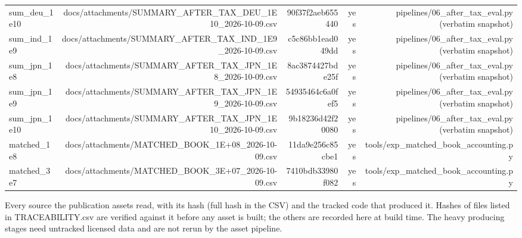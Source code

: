 \begin{table}[t]
\begin{tabular}{lrrrr}
sum\_deu\_1e10 & docs/attachments/SUMMARY\_AFTER\_TAX\_DEU\_1E10\_2026-10-09.csv & 90f37f2aeb655440 & yes & pipelines/06\_after\_tax\_eval.py (verbatim snapshot) \\
sum\_ind\_1e9 & docs/attachments/SUMMARY\_AFTER\_TAX\_IND\_1E9\_2026-10-09.csv & c5c86bb1ead049dd & yes & pipelines/06\_after\_tax\_eval.py (verbatim snapshot) \\
sum\_jpn\_1e8 & docs/attachments/SUMMARY\_AFTER\_TAX\_JPN\_1E8\_2026-10-09.csv & 8ac3874427bde25f & yes & pipelines/06\_after\_tax\_eval.py (verbatim snapshot) \\
sum\_jpn\_1e9 & docs/attachments/SUMMARY\_AFTER\_TAX\_JPN\_1E9\_2026-10-09.csv & 54935464c6a0fef5 & yes & pipelines/06\_after\_tax\_eval.py (verbatim snapshot) \\
sum\_jpn\_1e10 & docs/attachments/SUMMARY\_AFTER\_TAX\_JPN\_1E10\_2026-10-09.csv & 9b18236d42f20080 & yes & pipelines/06\_after\_tax\_eval.py (verbatim snapshot) \\
matched\_1e8 & docs/attachments/MATCHED\_BOOK\_1E+08\_2026-10-09.csv & 11da9e256c85cbe1 & yes & tools/exp\_matched\_book\_accounting.py \\
matched\_3e7 & docs/attachments/MATCHED\_BOOK\_3E+07\_2026-10-09.csv & 7410bdb33980f082 & yes & tools/exp\_matched\_book\_accounting.py \\
\bottomrule
\end{tabular}
\par\vspace{2pt}
\parbox{\textwidth}{\footnotesize Every source the publication assets read, with its hash (full hash in the CSV) and the tracked code that produced it. Hashes of files listed in TRACEABILITY.csv are verified against it before any asset is built; the others are recorded here at build time. The heavy producing stages need untracked licensed data and are not rerun by the asset pipeline.}
\end{table}
